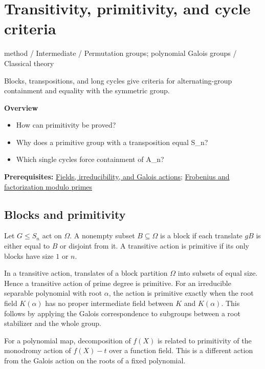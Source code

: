 \documentclass[11pt,a4paper,oneside,openany]{book}
\begin{document}
\chapter{Transitivity, primitivity, and cycle criteria}\label{article:permutation-groups}\hypertarget{article:permutation-groups}{}\color{black}
{\sffamily\small\color{atlasgold}method / Intermediate / Permutation groups; polynomial Galois groups / Classical theory}\par\medskip
Blocks, transpositions, and long cycles give criteria for alternating-group containment and equality with the symmetric group.\par\medskip
\textbf{Overview}\begin{itemize}
\item How can primitivity be proved?
\item Why does a primitive group with a transposition equal S\_\allowbreak{}n?
\item Which single cycles force containment of A\_\allowbreak{}n?
\end{itemize}
{\small\textbf{Prerequisites:} \hyperlink{article:foundations}{Fields, irreducibility, and Galois actions}; \hyperlink{article:frobenius}{Frobenius and factorization modulo primes}}\par
{}\section{Blocks and primitivity}
\color{black} Let \(G\le S_n\) act on \(\Omega\). A nonempty subset \(B\subseteq\Omega\) is a block if each translate \(gB\) is either equal to \(B\) or disjoint from it. A transitive action is primitive if its only blocks have size \(1\) or \(n\).\par
\color{black} In a transitive action, translates of a block partition \(\Omega\) into subsets of equal size. Hence a transitive action of prime degree is primitive. For an irreducible separable polynomial with root \(\alpha\), the action is primitive exactly when the root field \(K(\alpha)\) has no proper intermediate field between \(K\) and \(K(\alpha)\). This follows by applying the Galois correspondence to subgroups between a root stabilizer and the whole group.\par
\color{black} For a polynomial map, decomposition of \(f(X)\) is related to primitivity of the monodromy action of \(f(X)-t\) over a function field. This is a different action from the Galois action on the roots of a fixed polynomial.\par
\end{document}
